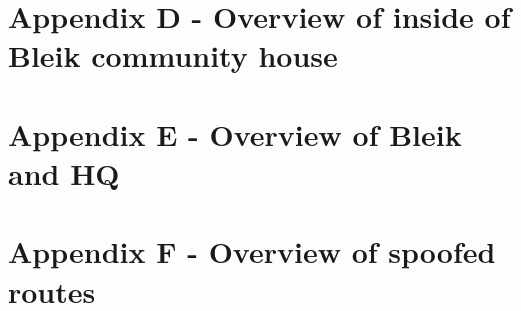 \documentclass[a4paper]{book}
\begin{document}
\section{Appendix D - Overview of inside of Bleik community house}


\section{Appendix E - Overview of Bleik and HQ}


\section{Appendix F - Overview of spoofed routes}

\end{document}
